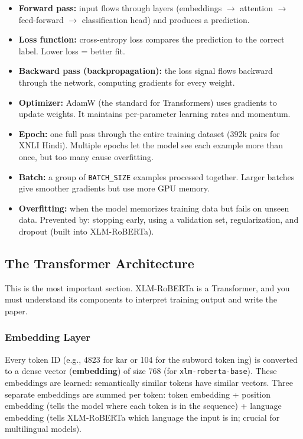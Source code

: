\begin{itemize}[nosep]
    \item \textbf{Forward pass:} input flows through layers (embeddings $\rightarrow$ attention $\rightarrow$ feed-forward $\rightarrow$ classification head) and produces a prediction.
    \item \textbf{Loss function:} cross-entropy loss compares the prediction to the correct label. Lower loss = better fit.
    \item \textbf{Backward pass (backpropagation):} the loss signal flows backward through the network, computing gradients for every weight.
    \item \textbf{Optimizer:} AdamW (the standard for Transformers) uses gradients to update weights. It maintains per-parameter learning rates and momentum.
    \item \textbf{Epoch:} one full pass through the entire training dataset (392k pairs for XNLI Hindi). Multiple epochs let the model see each example more than once, but too many cause overfitting.
    \item \textbf{Batch:} a group of \texttt{BATCH\_SIZE} examples processed together. Larger batches give smoother gradients but use more GPU memory.
    \item \textbf{Overfitting:} when the model memorizes training data but fails on unseen data. Prevented by: stopping early, using a validation set, regularization, and dropout (built into XLM-RoBERTa).
\end{itemize}

\subsection{The Transformer Architecture}

This is the most important section. XLM-RoBERTa is a Transformer, and you must understand its components to interpret training output and write the paper.

\subsubsection{Embedding Layer}

Every token ID (e.g., 4823 for \textsf{kar} or 104 for the subword token \textsf{ing}) is converted to a dense vector (\textbf{embedding}) of size 768 (for \texttt{xlm-roberta-base}). These embeddings are learned: semantically similar tokens have similar vectors. Three separate embeddings are summed per token: token embedding + position embedding (tells the model where each token is in the sequence) + language embedding (tells XLM-RoBERTa which language the input is in; crucial for multilingual models).

